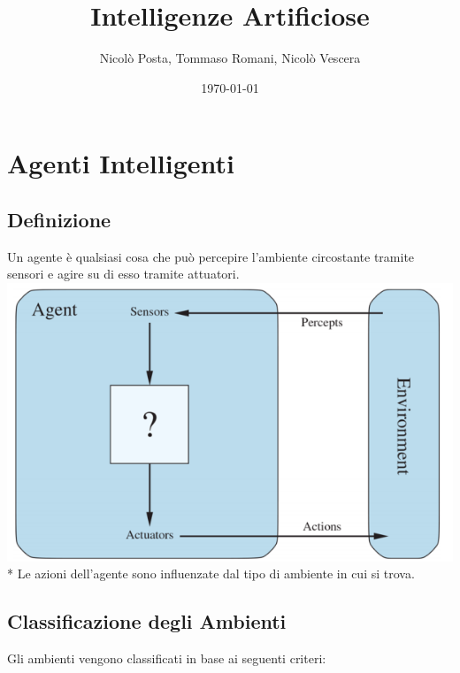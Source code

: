 \documentclass{article}
\title{Intelligenze Artificiose}
\author{Nicolò Posta, Tommaso Romani, Nicolò Vescera}
\date{\today}
\begin{document}
    \maketitle
    
    \tableofcontents

    \section{Agenti Intelligenti}
        \subsection{Definizione}
            Un agente è qualsiasi cosa che può percepire l'ambiente circostante tramite
            sensori e agire su di esso tramite attuatori.\newline\newline
            \includegraphics[scale=0.5]{agente}\\*
            Le azioni dell'agente sono influenzate dal tipo di ambiente in cui si trova.
        
        \clearpage

        \subsection{Classificazione degli Ambienti}
            Gli ambienti vengono classificati in base ai seguenti criteri:
\end{document}
